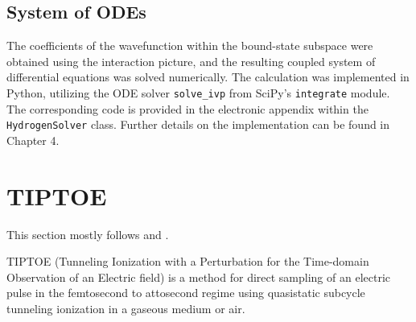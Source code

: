 



\subsection{System of ODEs}
The coefficients of the wavefunction within the bound-state subspace were obtained using the interaction picture, and the resulting coupled system of differential equations was solved numerically.
The calculation was implemented in Python, utilizing the ODE solver \texttt{solve\_ivp} from SciPy’s \texttt{integrate} module.
The corresponding code is provided in the electronic appendix \cite{johannes_porsch_2025_16223179} within the \texttt{HydrogenSolver} class.
Further details on the implementation can be found in Chapter 4.




\section{TIPTOE}
This section mostly follows \cite{Park:18} and \cite{manorammasterthesis}.

TIPTOE (Tunneling Ionization with a Perturbation for the Time-domain Observation of an Electric field) is a method for direct sampling of an electric pulse in the femtosecond to attosecond regime using quasistatic subcycle tunneling ionization in a gaseous medium or air.

